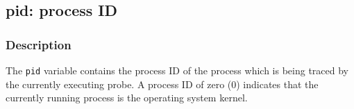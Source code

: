 \clearpage
{}
{}
\label{vars:pid}
\subsection*{pid: process ID}

\subsubsection*{Description}

The \verb|pid| variable contains the process ID of the process which
is being traced by the currently executing probe.  A process ID of
zero (0) indicates that the currently running process is the operating
system kernel.

